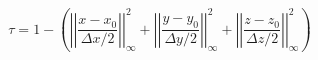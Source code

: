 \begin{equation}
\tau = 1 - \left(
    \left|\left|\frac{x - x_0}{\Delta x / 2}\right|\right|_\infty^2 +
    \left|\left|\frac{y - y_0}{\Delta y / 2}\right|\right|_\infty^2 +
    \left|\left|\frac{z - z_0}{\Delta z / 2}\right|\right|_\infty^2
\right)
\label{eq:tau_infinity}
\end{equation}
